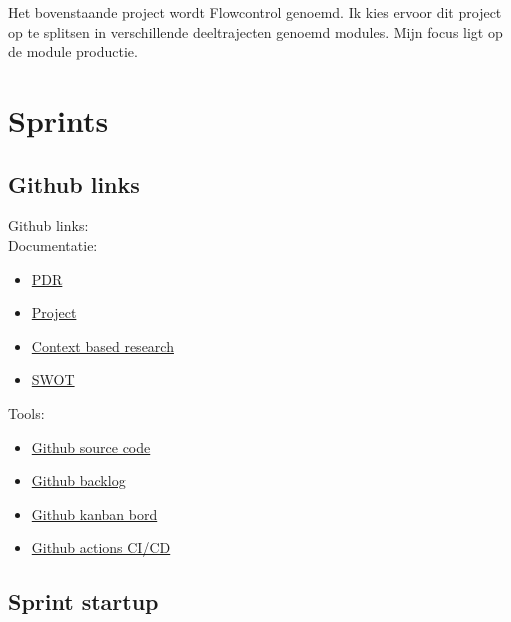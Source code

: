 \documentclass[11pt, twoside]{report}
\begin{document}
    \newline

    Het bovenstaande project wordt Flowcontrol genoemd. Ik kies ervoor dit project op te splitsen in verschillende
    deeltrajecten genoemd modules. Mijn focus ligt op de module productie.

    \newpage

    \chapter{Sprints}
    \label{ch:sprints}

    \section{Github links}\label{sec:github-links}
    Github links: \\
    \newline
    Documentatie:
    \begin{itemize}
        \item \href{https://github.com/rikp777/RP-Flowcontrol/blob/master/documentation/PDR/out/PDR_main.pdf}{PDR}
        \item \href{https://github.com/rikp777/RP-Flowcontrol/blob/master/documentation/project/out/Project_Rik_Peeters.pdf}{Project}
        \item \href{https://github.com/rikp777/RP-Flowcontrol/blob/master/documentation/context_based_research/out/context_based_research_Rik_Peeters.pdf}{Context based research}
        \item \href{https://github.com/rikp777/RP-Flowcontrol/blob/master/documentation/SWOT/out/SWOT_Rik_Peeters.pdf}{SWOT}
    \end{itemize}
    \newline
    Tools:
    \begin{itemize}
        \item \href{https://github.com/rikp777/RP-Flowcontrol}{Github source code}
        \item \href{https://github.com/rikp777/RP-Flowcontrol/issues}{Github backlog}
        \item \href{https://github.com/rikp777/RP-Flowcontrol/projects/1}{Github kanban bord}
        \item \href{https://github.com/rikp777/RP-Flowcontrol/actions}{Github actions CI/CD}
    \end{itemize}

    \newpage
    \section{Sprint startup}
    \label{sec:sprint-0}
\end{document}
